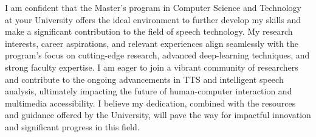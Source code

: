\documentclass[12pt,a4paper]{article}
\begin{document}
\begin{CJK*}{UTF8}{gbsn}
I am confident that the Master's program in Computer Science and Technology at your University offers the ideal environment to further develop my skills and make a significant contribution to the field of speech technology. My research interests, career aspirations, and relevant experiences align seamlessly with the program's focus on cutting-edge research, advanced deep-learning techniques, and strong faculty expertise. I am eager to join a vibrant community of researchers and contribute to the ongoing advancements in TTS and intelligent speech analysis, ultimately impacting the future of human-computer interaction and multimedia accessibility. I believe my dedication, combined with the resources and guidance offered by the University, will pave the way for impactful innovation and significant progress in this field.




\end{CJK*}
\end{document}
